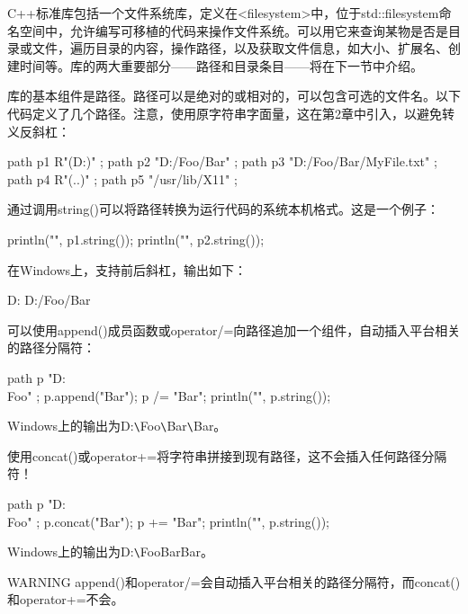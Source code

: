 
C++标准库包括一个文件系统库，定义在<filesystem>中，位于std::filesystem命名空间中，允许编写可移植的代码来操作文件系统。可以用它来查询某物是否是目录或文件，遍历目录的内容，操作路径，以及获取文件信息，如大小、扩展名、创建时间等。库的两大重要部分——路径和目录条目——将在下一节中介绍。


库的基本组件是路径。路径可以是绝对的或相对的，可以包含可选的文件名。以下代码定义了几个路径。注意，使用原字符串字面量，这在第2章中引入，以避免转义反斜杠：

\begin{cpp}
path p1 { R"(D:\Foo\Bar)" };
path p2 { "D:/Foo/Bar" };
path p3 { "D:/Foo/Bar/MyFile.txt" };
path p4 { R"(..\SomeFolder)" };
path p5 { "/usr/lib/X11" };
\end{cpp}

通过调用string()可以将路径转换为运行代码的系统本机格式。这是一个例子：

\begin{cpp}
println("{}", p1.string());
println("{}", p2.string());
\end{cpp}

在Windows上，支持前后斜杠，输出如下：

\begin{shell}
D:\Foo\Bar
D:/Foo/Bar
\end{shell}

可以使用append()成员函数或operator/=向路径追加一个组件，自动插入平台相关的路径分隔符：

\begin{cpp}
path p { "D:\\Foo" };
p.append("Bar");
p /= "Bar";
println("{}", p.string());
\end{cpp}

Windows上的输出为D:\verb|\|Foo\verb|\|Bar\verb|\|Bar。

使用concat()或operator+=将字符串拼接到现有路径，这不会插入任何路径分隔符！

\begin{cpp}
path p { "D:\\Foo" };
p.concat("Bar");
p += "Bar";
println("{}", p.string());
\end{cpp}

Windows上的输出为D:\verb|\|FooBarBar。

\begin{myWarning}{WARNING}
append()和operator/=会自动插入平台相关的路径分隔符，而concat()和operator+=不会。
\end{myWarning}


